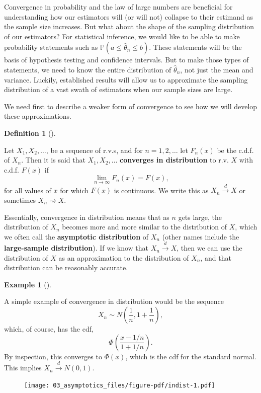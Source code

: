 \documentclass[
  letterpaper,
  DIV=11,
  numbers=noendperiod]{scrreprt}
\renewcommand{\P}{\mathbb{P}}
\newcommand{\indist}{\overset{d}{\to}}
\theoremstyle{plain}
\theoremstyle{definition}
\newtheorem{example}{Example}[chapter]
\theoremstyle{definition}
\newtheorem{definition}{Definition}[chapter]
\theoremstyle{remark}
\begin{document}
Convergence in probability and the law of large numbers are beneficial
for understanding how our estimators will (or will not) collapse to
their estimand as the sample size increases. But what about the shape of
the sampling distribution of our estimators? For statistical inference,
we would like to be able to make probability statements such as
\(\P(a \leq \widehat{\theta}_n \leq b)\). These statements will be the
basis of hypothesis testing and confidence intervals. But to make those
types of statements, we need to know the entire distribution of
\(\widehat{\theta}_n\), not just the mean and variance. Luckily,
established results will allow us to approximate the sampling
distribution of a vast swath of estimators when our sample sizes are
large.

We need first to describe a weaker form of convergence to see how we
will develop these approximations.

\begin{definition}[]\protect\hypertarget{def-indist}{}\label{def-indist}

Let \(X_1,X_2,\ldots\), be a sequence of r.v.s, and for
\(n = 1,2, \ldots\) let \(F_n(x)\) be the c.d.f. of \(X_n\). Then it is
said that \(X_1, X_2, \ldots\) \textbf{converges in distribution} to
r.v. \(X\) with c.d.f. \(F(x)\) if \[
\lim_{n\rightarrow \infty} F_n(x) = F(x),
\] for all values of \(x\) for which \(F(x)\) is continuous. We write
this as \(X_n \indist X\) or sometimes \(X_n ⇝ X\).

\end{definition}

Essentially, convergence in distribution means that as \(n\) gets large,
the distribution of \(X_n\) becomes more and more similar to the
distribution of \(X\), which we often call the \textbf{asymptotic
distribution} of \(X_n\) (other names include the \textbf{large-sample
distribution}). If we know that \(X_n \indist X\), then we can use the
distribution of \(X\) as an approximation to the distribution of
\(X_n\), and that distribution can be reasonably accurate.

\begin{example}[]\protect\hypertarget{exm-indist}{}\label{exm-indist}

A simple example of convergence in distribution would be the sequence \[
X_n \sim N\left(\frac{1}{n}, 1 + \frac{1}{n}\right),
\] which, of course, has the cdf, \[
\Phi\left(\frac{x - 1/n}{1+1/n}\right).
\] By inspection, this converges to \(\Phi(x)\), which is the cdf for
the standard normal. This implies \(X_n \indist N(0, 1)\).

\begin{figure}[th]

{\centering \texttt{[image: 03\_asymptotics\_files/figure-pdf/indist-1.pdf]}

}

\end{figure}

\end{example}
\end{document}
